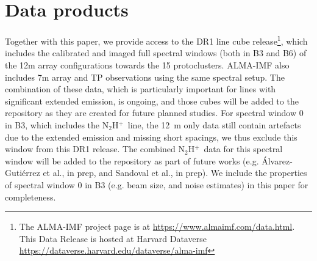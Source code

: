 \documentclass[longauth]{aa} %
\newcommand{\nthp}{\mbox{N$_2$H$^+$}}
\begin{document}
\section{Data products}
\label{sec:data}
Together with this paper, we provide access to the DR1 line cube release\footnote{The ALMA-IMF project page is at \url{https://www.almaimf.com/data.html}. This Data Release is hosted at Harvard Dataverse \url{https://dataverse.harvard.edu/dataverse/alma-imf}}, which includes the calibrated and imaged full spectral windows (both in B3 and B6) of the 12m array configurations towards the 15 protoclusters. 
ALMA-IMF also includes 7m array and TP observations using the same spectral setup. The combination of these data, which is particularly important for lines with significant extended emission, is ongoing, and those cubes will be added to the repository as they are created for future planned studies. For spectral window 0 in B3, which includes the \nthp\, line, the 12~m only data still contain artefacts due to the extended emission and missing short spacings, we thus exclude this window from this DR1 release. The combined \nthp\, data for this spectral window will be added to the repository as part of future works (e.g. \citealt{Stutz22} \'Alvarez-Guti\'errez et al., in prep, and Sandoval et al., in prep). We include the properties of spectral window 0 in B3 (e.g. beam size, and noise estimates) in this paper for completeness.
\end{document}
